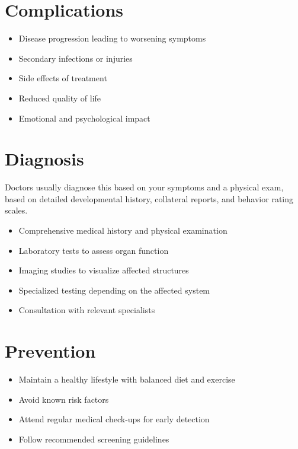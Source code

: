 \section{Complications}
\begin{itemize}[noitemsep]
  \item Disease progression leading to worsening symptoms
  \item Secondary infections or injuries
  \item Side effects of treatment
  \item Reduced quality of life
  \item Emotional and psychological impact
\end{itemize}
\section{Diagnosis}
Doctors usually diagnose this based on your symptoms and a physical exam, based on detailed developmental history, collateral reports, and behavior rating scales.

\begin{itemize}[noitemsep]
  \item Comprehensive medical history and physical examination
  \item Laboratory tests to assess organ function
  \item Imaging studies to visualize affected structures
  \item Specialized testing depending on the affected system
  \item Consultation with relevant specialists
\end{itemize}
\section{Prevention}
\begin{itemize}[noitemsep]
  \item Maintain a healthy lifestyle with balanced diet and exercise
  \item Avoid known risk factors
  \item Attend regular medical check-ups for early detection
  \item Follow recommended screening guidelines
\end{itemize}
